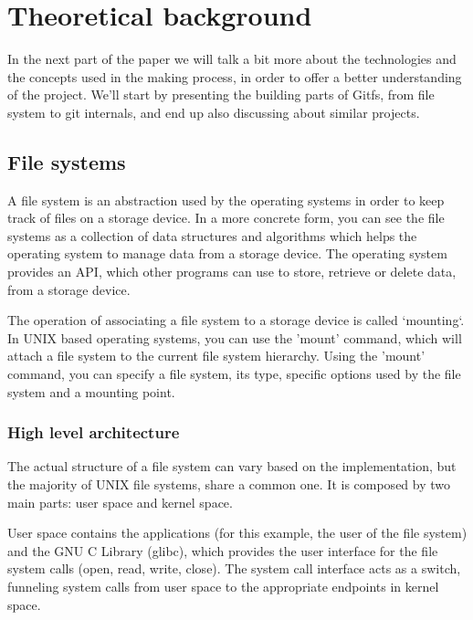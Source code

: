 \chapter{Theoretical background}

\label{ch:theoretical}
In the next part of the paper we will talk a bit more about the technologies and the concepts used in the making process, in order to offer a better understanding of the project. We'll start by presenting the building parts of Gitfs, from file system to git internals, and end up also discussing about similar projects. 

\section{File systems}
    A file system is an abstraction used by the operating systems in order to keep track of files on a storage device. In a more concrete form, you can see the file systems as a collection of data structures and algorithms which helps the operating system to manage data from a storage device. The operating system provides an API, which other programs can use to store, retrieve or delete data, from a storage device.
    
    The operation of associating a file system to a storage device is called `mounting`. In UNIX based operating systems, you can use the 'mount' command, which will attach a file system to the current file system hierarchy. Using the 'mount' command, you can specify a file system, its type, specific options used by the file system and a mounting point.

    \subsection{High level architecture}
        The actual structure of a file system can vary based on the implementation, but the majority of UNIX file systems, share a common one. It is composed by two main parts: user space and kernel space. 
        
        User space contains the applications (for this example, the user of the file system) and the GNU C Library (glibc), which provides the user interface for the file system calls (open, read, write, close). The system call interface acts as a switch, funneling system calls from user space to the appropriate endpoints in kernel space. 
        
